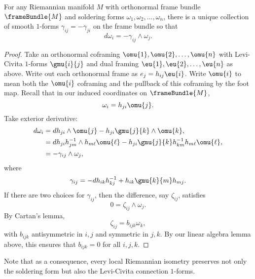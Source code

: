 \begin{lemma}%
\label{lemma:FLRG}%
%
For any Riemannian manifold \(M\) with orthonormal frame bundle \(\frameBundle{M}\) and soldering forms \(\omega_1, \omega_2, \dots, \omega_n\), there is a unique collection of smooth \(1\)-forms \(\gamma_{ij}=-\gamma_{ji}\) on the frame bundle so that 
\[
d \omega_i = - \gamma_{ij} \wedge \omega_j.
\]
\end{lemma}
\begin{proof}
Take an orthonormal coframing \(\omu{1}, \omu{2},\dots,\omu{n}\) with Levi-Civita \(1\)-forms \(\gmu{i}{j}\) and dual framing \(\eu{1},\eu{2},\dots,\eu{n}\) as above.
Write out each orthonormal frame as \(e_j = h_{ij}\eu{i}\).
Write \(\omu{i}\) to mean both the \(\omu{i}\) coframing and the pullback of this coframing by the foot map.
Recall that in our induced coordinates on \(\frameBundle{M}\), 
\[
\omega_i = h_{ji}\omu{j}.
\]
Take exterior derivative:
\begin{align*}
d \omega_i 
&= 
dh_{ji} \wedge \omu{j} - h_{ji} \gmu{j}{k} \wedge\omu{k},
\\
&=
dh_{ji} h^{-1}_{jm} \wedge h_{m\ell} \omu{\ell} 
-
h_{ji} \gmu{j}{k} h^{-1}_{km} h_{m \ell}\omu{\ell},
\\
&=
-\gamma_{ij}\wedge\omega_j,
\end{align*}
where
\[
\gamma_{ij} = - dh_{ik} h^{-1}_{kj} + h_{ik} \gmu{k}{m} h_{mj}.
\]
If there are two choices for \(\gamma_{ij}\), then the difference, say \(\zeta_{ij}\), satisfies 
\[
0 = \zeta_{ij} \wedge \omega_j.
\]
By Cartan's lemma, 
\[
\zeta_{ij} = b_{ijk} \omega_k,
\]
with \(b_{ijk}\) antisymmetric in \(i,j\) and symmetric in \(j,k\).
By our linear algebra lemma above, this ensures that \(b_{ijk}=0\) for all \(i,j,k\).
\end{proof}

Note that as a consequence, every local Riemannian isometry preserves not only the soldering form but also the Levi-Civita connection \(1\)-forms.

